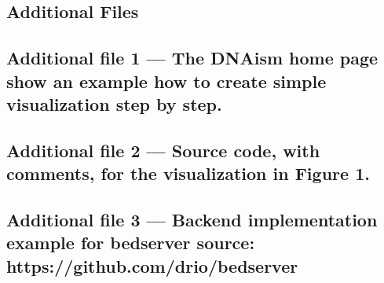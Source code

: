 \documentclass[twocolumn]{bmcart}
\begin{document}
\begin{backmatter}

\section*{Additional Files}
\subsection*{Additional file 1 --- The DNAism home page show an example how to create simple visualization step by step.}
\subsection*{Additional file 2 --- Source code, with comments, for the visualization in Figure 1.}
\subsection*{Additional file 3 --- Backend implementation example for bedserver source: https://github.com/drio/bedserver}


\end{backmatter}
\end{document}
